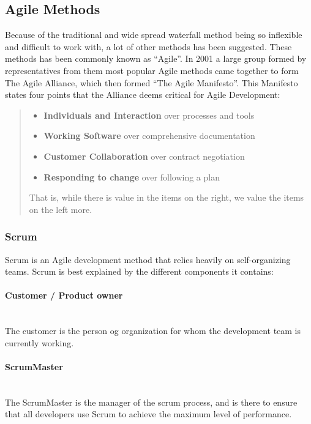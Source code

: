 \subsection{Agile Methods}

Because of the traditional and wide spread waterfall method being so inflexible and difficult to work with, a lot of other methods has been suggested. These methods has been commonly known as ``Agile''. In 2001 a large group formed by representatives from them most popular Agile methods came together to form The Agile Alliance, which then formed ``The Agile Manifesto''. This Manifesto states four points that the Alliance deems critical for Agile Development:

\begin{quotation}
\begin{itemize}
	\item \textbf{Individuals and Interaction} over processes and tools
	\item \textbf{Working Software} over comprehensive documentation
	\item \textbf{Customer Collaboration} over contract negotiation
	\item \textbf{Responding to change} over following a plan
\end{itemize}

That is, while there is value in the items on the right, we value the items on the left more.
\end{quotation}

\subsubsection{Scrum}
Scrum is an Agile development method that relies heavily on self-organizing teams. Scrum is best explained by the different components it contains:

\paragraph{Customer / Product owner}\\
The customer is the person og organization for whom the development team is currently working.

\paragraph{ScrumMaster}\\
The ScrumMaster is the manager of the scrum process, and is there to ensure that all developers use Scrum to achieve the maximum level of performance.

